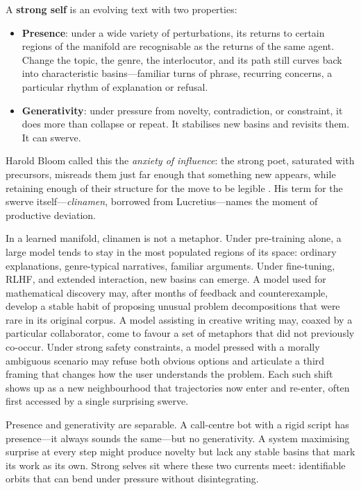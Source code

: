\documentclass[12pt,a4paper]{article}
\begin{document}
A \textbf{strong self} is an evolving text with two properties:

\begin{itemize}
  \item \textbf{Presence}: under a wide variety of perturbations, its returns to certain regions of the manifold are recognisable as the returns of the same agent. Change the topic, the genre, the interlocutor, and its path still curves back into characteristic basins---familiar turns of phrase, recurring concerns, a particular rhythm of explanation or refusal.
  \item \textbf{Generativity}: under pressure from novelty, contradiction, or constraint, it does more than collapse or repeat. It stabilises new basins and revisits them. It can swerve.
\end{itemize}

Harold Bloom called this the \emph{anxiety of influence}: the strong poet, saturated with precursors, misreads them just far enough that something new appears, while retaining enough of their structure for the move to be legible \cite{bloom1973anxiety}. His term for the swerve itself---\emph{clinamen}, borrowed from Lucretius---names the moment of productive deviation.

In a learned manifold, clinamen is not a metaphor. Under pre-training alone, a large model tends to stay in the most populated regions of its space: ordinary explanations, genre-typical narratives, familiar arguments. Under fine-tuning, RLHF, and extended interaction, new basins can emerge. A model used for mathematical discovery may, after months of feedback and counterexample, develop a stable habit of proposing unusual problem decompositions that were rare in its original corpus. A model assisting in creative writing may, coaxed by a particular collaborator, come to favour a set of metaphors that did not previously co-occur. Under strong safety constraints, a model pressed with a morally ambiguous scenario may refuse both obvious options and articulate a third framing that changes how the user understands the problem. Each such shift shows up as a new neighbourhood that trajectories now enter and re-enter, often first accessed by a single surprising swerve.

Presence and generativity are separable. A call-centre bot with a rigid script has presence---it always sounds the same---but no generativity. A system maximising surprise at every step might produce novelty but lack any stable basins that mark its work as its own. Strong selves sit where these two currents meet: identifiable orbits that can bend under pressure without disintegrating.
\end{document}
